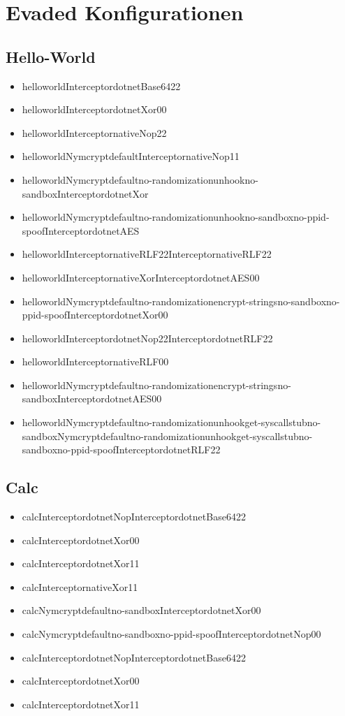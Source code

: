 \section{Evaded Konfigurationen}
\subsection{Hello-World}
\begin{itemize}
\item helloworldInterceptordotnetBase6422
\item helloworldInterceptordotnetXor00
\item helloworldInterceptornativeNop22
\item helloworldNymcryptdefaultInterceptornativeNop11
\item helloworldNymcryptdefaultno-randomizationunhookno-sandboxInterceptordotnetXor
\item helloworldNymcryptdefaultno-randomizationunhookno-sandboxno-ppid-spoofInterceptordotnetAES
\item helloworldInterceptornativeRLF22InterceptornativeRLF22
\item helloworldInterceptornativeXorInterceptordotnetAES00
\item helloworldNymcryptdefaultno-randomizationencrypt-stringsno-sandboxno-ppid-spoof\-InterceptordotnetXor00
\item helloworldInterceptordotnetNop22InterceptordotnetRLF22
\item helloworldInterceptornativeRLF00
\item helloworldNymcryptdefaultno-randomization\-encrypt-stringsno-sandbox\-InterceptordotnetAES00
\item helloworldNymcryptdefaultno-randomizationunhookget-syscallstubno-sandbox\-Nymcryptdefaultno-randomizationunhookget-syscallstubno-sandboxno-ppid-spoofInterceptordotnetRLF22
\end{itemize}

\subsection{Calc}
\begin{itemize}
\item calcInterceptordotnetNopInterceptordotnetBase6422
\item calcInterceptordotnetXor00
\item calcInterceptordotnetXor11
\item calcInterceptornativeXor11
\item calcNymcryptdefaultno-sandboxInterceptordotnetXor00
\item calcNymcryptdefaultno-sandboxno-ppid-spoofInterceptordotnetNop00
\item calcInterceptordotnetNopInterceptordotnetBase6422
\item calcInterceptordotnetXor00
\item calcInterceptordotnetXor11
\end{itemize}
    

